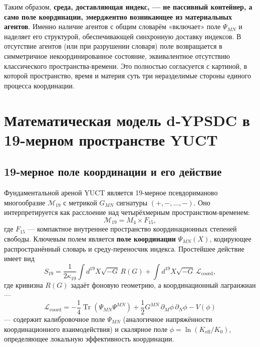 \documentclass[11pt,a4paper]{article}
\DeclareMathOperator*{\Tr}{Tr}
\begin{document}
	Таким образом, \textbf{среда, доставляющая индекс, — не пассивный контейнер, а само поле координации, эмерджентно возникающее из материальных агентов}. Именно наличие агентов с общим словарём «включает» поле \(\Psi_{MN}\) и наделяет его структурой, обеспечивающей синхронную доставку индексов. В отсутствие агентов (или при разрушении словаря) поле возвращается в симметричное некоординированное состояние, эквивалентное отсутствию классического пространства-времени. Это полностью согласуется с картиной, в которой пространство, время и материя суть три неразделимые стороны единого процесса координации.
	
	\section{Математическая модель d‑YPSDC в 19-мерном пространстве YUCT}
	\label{sec:math-model}
	
	\subsection{19-мерное поле координации и его действие}
	
	Фундаментальной ареной YUCT является 19-мерное псевдориманово многообразие \(\mathcal{M}_{19}\) с метрикой \(G_{MN}\) сигнатуры \((+,-,\dots,-)\). Оно интерпретируется как расслоение над четырёхмерным пространством-временем:
	\begin{equation}
		\mathcal{M}_{19} = M_4 \times F_{15},
	\end{equation}
	где \(F_{15}\) — компактное внутреннее пространство координационных степеней свободы. Ключевым полем является \textbf{поле координации} \(\Psi_{MN}(X)\), кодирующее распространённый словарь и среду-переносчик индекса. Простейшее действие имеет вид
	\begin{equation}
		S_{19} = \frac{1}{2\kappa_{19}} \int d^{19}X \sqrt{-G}\, R(G) + \int d^{19}X \sqrt{-G}\, \mathcal{L}_{\mathrm{coord}},
		\label{eq:S19}
	\end{equation}
	где кривизна \(R(G)\) задаёт фоновую геометрию, а координационный лагранжиан —
	\begin{equation}
		\mathcal{L}_{\mathrm{coord}} = -\frac{1}{4} \Tr(\Psi_{MN}\Psi^{MN}) + \frac{1}{2} G^{MN}\,\partial_M \phi\,\partial_N \phi - V(\phi)
		\label{eq:Lcoord}
	\end{equation}
	— содержит калибровочное поле \(\Psi_{MN}\) (аналогичное напряжённости координационного взаимодействия) и скалярное поле \(\phi = \ln(K_{\mathrm{eff}}/K_0)\), определяющее локальную эффективность координации.
	
\end{document}
